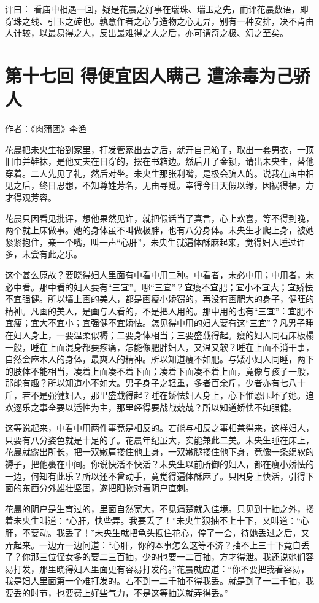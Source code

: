 \documentclass[a4paper,12pt,UTF8,twoside]{ctexbook}
\begin{document}
评曰： 看庙中相遇一回，疑是花晨之好事在瑞珠、瑞玉之先，而评花晨数语，即穿珠之线、引玉之砖也。孰意作者之心与造物之心无异，别有一种安排，决不肯由人计较，以最易得之人，反出最难得之人之后，亦可谓奇之极、幻之至矣。

\chapter{第十七回 得便宜因人瞒己 遭涂毒为己骄人}

作者：《肉蒲团》李渔

花晨把未央生抬到家里，打发管家出去之后，就开自己箱子，取出一套男衣，一顶旧巾并鞋袜，是他丈夫在日穿的，摆在书箱边。然后开了金锁，请出未央生，替他穿着。二人先见了礼，然后对坐。未央生那张利嘴，是极会骗人的。说我在庙中相见之后，终日思想，不知尊姓芳名，无由寻觅。幸得今日天假以缘，因祸得福，方才得观芳容。

花晨只因看见批评，想他果然见许，就把假话当了真言，心上欢喜，等不得到晚，两个就上床做事。她的身体虽不叫做极胖，也有八分身体。未央生才爬上身，被她紧紧抱住，亲一个嘴，叫一声“心肝”，未央生就遍体酥麻起来，觉得妇人睡过许多，未尝有此之乐。

这个甚么原故？要晓得妇人里面有中看中用二种。中看者，未必中用；中用者，未必中看。那中看的妇人要有“三宜”。哪“三宜”？宜瘦不宜肥；宜小不宜大；宜娇怯不宜强健。所以墙上画的美人，都是画瘦小娇窃的，再没有画肥大的身子，健旺的精神。凡画的美人，是画与人看的，不是把人用的。那中用的也有“三宜”：宜肥不宜瘦；宜大不宜小；宜强健不宜娇怯。怎见得中用的妇人要有这“三宜”？凡男子睡在妇人身上，一要温柔似褥；二要身体相当；三要盛载得起。瘦的妇人同石床板榻一般，睡在上面混身都要疼痛，怎能像肥胖妇人，又温又软？睡在上面不消干事，自然会麻木人的身体，最爽人的精神。所以知道瘦不如肥。与矮小妇人同睡，两下的肢体不能相当，凑着上面凑不着下面；凑着下面凑不着上面，竟像与孩子一般，那能有趣？所以知道小不如大。男子身子之轻重，多者百余斤，少者亦有七八十斤，若不是强健妇人，那里盛载得起？睡在娇怯妇人身上，心下惟恐压坏了她。追欢逐乐之事全要以适性为主，那里经得要战战兢兢？所以知道娇怯不如强健。

这等说起来，中看中用两件事竟是相反的。若能与相反之事相兼得来，这样妇人，只要有八分姿色就是十足的了。花晨年纪虽大，实能兼此二美。未央生睡在床上，花晨就露出所长，把一双嫩肩搂住他上身，一双嫩腿搂住他下身，竟像一条绵软的褥子，把他裹在中间。你说快活不快活？未央生以前所御的妇人，都在瘦小娇怯的一边，何知有此乐？所以还不曾动手，竟觉得遍体酥麻了。只因身上快活，引得下面的东西分外雄壮坚固，遂把阳物对着阴户直刺。

花晨的阴户是生育过的，里面自然宽大，不见痛楚就入佳境。只见到十抽之外，搂着未央生叫道：“心肝，快些弄。我要丢了！”未央生狠抽不上十下，又叫道：“心肝，不要动。我丢了！”未央生就把龟头抵住花心，停了一会，待她丢过之后，又弄起来。一边弄一边问道：“心肝，你的本事怎么这等不济？抽不上三十下竟自丢了？你那三位侄女多的要二三百抽，少的也要一二百抽，方才得泄。我还说她们容易打发，那里晓得妇人里面更有容易打发的。”花晨就应道：“你不要把我看容易，我是妇人里面第一个难打发的。若不到一二千抽不得我丢。就是到了一二千抽，我要丢的时节，也要费上好些气力，不是这等抽送就弄得丢。”
\end{document}
